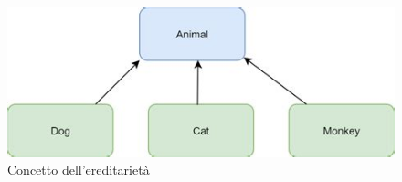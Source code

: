 \begin{figure}[ht]
	\centering
	\includegraphics[width=1\textwidth, height=1\textheight, keepaspectratio]{./imgs/animal_class_uml.jpg}
	\caption{Concetto dell'ereditarietà}
	\label{fig:ereditarietà2}
\end{figure}

